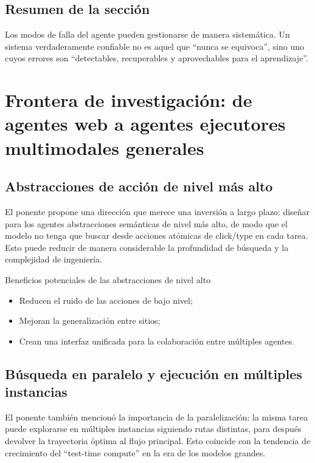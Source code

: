 \documentclass[a4paper]{article}
\begin{document}
\subsection{Resumen de la sección}
Los modos de falla del agente pueden gestionarse de manera sistemática. Un sistema verdaderamente confiable no es aquel que ``nunca se equivoca'', sino uno cuyos errores son ``detectables, recuperables y aprovechables para el aprendizaje''.

\section{Frontera de investigación: de agentes web a agentes ejecutores multimodales generales}

\subsection{Abstracciones de acción de nivel más alto}
El ponente propone una dirección que merece una inversión a largo plazo: diseñar para los agentes abstracciones semánticas de nivel más alto, de modo que el modelo no tenga que buscar desde acciones atómicas de click/type en cada tarea. Esto puede reducir de manera considerable la profundidad de búsqueda y la complejidad de ingeniería.

\begin{importantbox}{Beneficios potenciales de las abstracciones de nivel alto}
\begin{itemize}
    \item Reducen el ruido de las acciones de bajo nivel;
    \item Mejoran la generalización entre sitios;
    \item Crean una interfaz unificada para la colaboración entre múltiples agentes.
\end{itemize}
\end{importantbox}

\subsection{Búsqueda en paralelo y ejecución en múltiples instancias}
El ponente también mencionó la importancia de la paralelización: la misma tarea puede explorarse en múltiples instancias siguiendo rutas distintas, para después devolver la trayectoria óptima al flujo principal. Esto coincide con la tendencia de crecimiento del ``test-time compute'' en la era de los modelos grandes.
\end{document}
